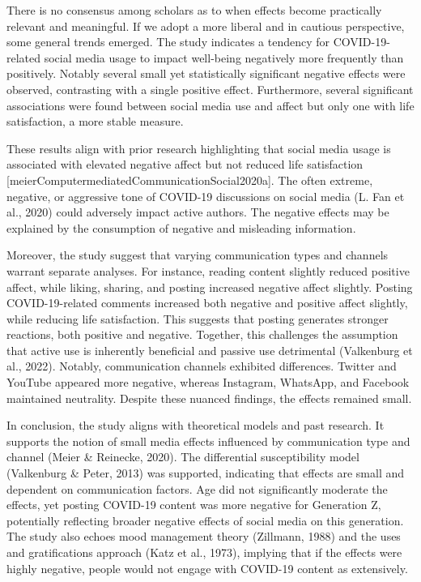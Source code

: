 \documentclass[
  man,mask,floatsintext]{apa7}
\begin{document}
There is no consensus among scholars as to when effects become practically relevant and meaningful. If we adopt a more liberal and in cautious perspective, some general trends emerged. The study indicates a tendency for COVID-19-related social media usage to impact well-being negatively more frequently than positively. Notably several small yet statistically significant negative effects were observed, contrasting with a single positive effect. Furthermore, several significant associations were found between social media use and affect but only one with life satisfaction, a more stable measure.

These results align with prior research highlighting that social media usage is associated with elevated negative affect but not reduced life satisfaction {[}meierComputermediatedCommunicationSocial2020a{]}. The often extreme, negative, or aggressive tone of COVID-19 discussions on social media (L. Fan et al., 2020) could adversely impact active authors. The negative effects may be explained by the consumption of negative and misleading information.

Moreover, the study suggest that varying communication types and channels warrant separate analyses. For instance, reading content slightly reduced positive affect, while liking, sharing, and posting increased negative affect slightly. Posting COVID-19-related comments increased both negative and positive affect slightly, while reducing life satisfaction. This suggests that posting generates stronger reactions, both positive and negative. Together, this challenges the assumption that active use is inherently beneficial and passive use detrimental (Valkenburg et al., 2022). Notably, communication channels exhibited differences. Twitter and YouTube appeared more negative, whereas Instagram, WhatsApp, and Facebook maintained neutrality. Despite these nuanced findings, the effects remained small.

In conclusion, the study aligns with theoretical models and past research. It supports the notion of small media effects influenced by communication type and channel (Meier \& Reinecke, 2020). The differential susceptibility model (Valkenburg \& Peter, 2013) was supported, indicating that effects are small and dependent on communication factors. Age did not significantly moderate the effects, yet posting COVID-19 content was more negative for Generation Z, potentially reflecting broader negative effects of social media on this generation. The study also echoes mood management theory (Zillmann, 1988) and the uses and gratifications approach (Katz et al., 1973), implying that if the effects were highly negative, people would not engage with COVID-19 content as extensively.
\end{document}
